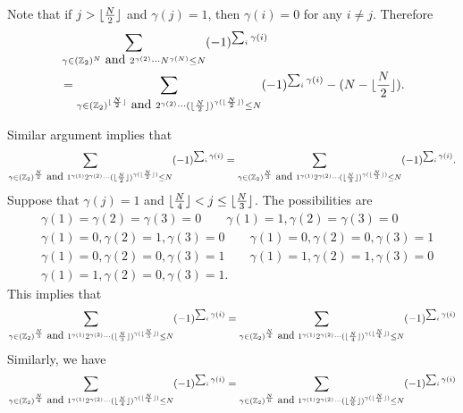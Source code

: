 \documentclass[a4paper,10pt]{amsart}
\newcommand{\Z}{\mathbb Z} %
\DeclarePairedDelimiter\floor{\lfloor}{\rfloor}
\begin{document}
Note that if $j > \floor{\frac{N}{2}}$ and $\gamma(j) = 1$, 
    then $\gamma(i) = 0$ for any $i \neq j$. 
    Therefore
    \begin{align*}
        &\sum_{\gamma \in (\Z_{2})^{N} \mbox{ and } 
        2^{\gamma(2)}\cdots N^{\gamma(N)} \leq N} 
        (-1)^{\sum_{i}\gamma(i)}\\ 
        &= \sum_{\gamma \in (\Z_{2})^{\floor{\frac{N}{2}}} \mbox{ and } 
        2^{\gamma(2)}\cdots 
        (\floor{\frac{N}{2}})^{\gamma(\floor{\frac{N}{2}})} \leq N} 
        (-1)^{\sum_{i}\gamma(i)} - (N- \floor{\frac{N}{2}}). 
    \end{align*}


Similar argument implies that
\begin{align*}
    \sum_{\gamma \in (\Z_{2})^{\frac{N}{2}} \mbox{ and } 
    1^{\gamma(1)}2^{\gamma(2)}\cdots 
(\floor{\frac{N}{2}})^{\gamma(\floor{\frac{N}{2}})} \leq N} 
    (-1)^{\sum_{i}\gamma(i)}
=\sum_{\gamma \in (\Z_{2})^{\frac{N}{3}} \mbox{ and } 
    1^{\gamma(1)}2^{\gamma(2)}\cdots 
(\floor{\frac{N}{3}})^{\gamma(\floor{\frac{N}{3}})} \leq N} 
    (-1)^{\sum_{i}\gamma(i)}.
\end{align*}
Suppose that $\gamma(j) = 1$ and $\floor{\frac{N}{4}} < j \leq 
\floor{\frac{N}{3}}$.
The possibilities are
\begin{align*}
    &\gamma(1) = \gamma(2) = \gamma(3) = 0 \qquad 
    \gamma(1) = 1, \gamma(2) = \gamma(3) = 0 \\
    &\gamma(1) = 0, \gamma(2) = 1, \gamma(3) = 0 \qquad 
    \gamma(1) = 0, \gamma(2) = 0, \gamma(3) = 1 \\
    &\gamma(1) = 0, \gamma(2) = 0, \gamma(3) = 1 \qquad 
    \gamma(1) = 1, \gamma(2) = 1, \gamma(3) = 0 \\
    &\gamma(1) = 1, \gamma(2) = 0, \gamma(3) = 1.
\end{align*}
This implies that
\begin{align*}
    \sum_{\gamma \in (\Z_{2})^{\frac{N}{3}} \mbox{ and } 
    1^{\gamma(1)}2^{\gamma(2)}\cdots 
(\floor{\frac{N}{3}})^{\gamma(\floor{\frac{N}{3}})} \leq N} 
    (-1)^{\sum_{i}\gamma(i)}
=\sum_{\gamma \in (\Z_{2})^{\frac{N}{4}} \mbox{ and } 
    1^{\gamma(1)}2^{\gamma(2)}\cdots 
(\floor{\frac{N}{4}})^{\gamma(\floor{\frac{N}{4}})} \leq N} 
    (-1)^{\sum_{i}\gamma(i)}
\end{align*}
Similarly, we have
\begin{align*}
    \sum_{\gamma \in (\Z_{2})^{\frac{N}{4}} \mbox{ and } 
    1^{\gamma(1)}2^{\gamma(2)}\cdots 
(\floor{\frac{N}{4}})^{\gamma(\floor{\frac{N}{4}})} \leq N} 
    (-1)^{\sum_{i}\gamma(i)}
    =\sum_{\gamma \in (\Z_{2})^{\frac{N}{6}} \mbox{ and } 
    1^{\gamma(1)}2^{\gamma(2)}\cdots 
(\floor{\frac{N}{6}})^{\gamma(\floor{\frac{N}{6}})} \leq N} 
    (-1)^{\sum_{i}\gamma(i)}
\end{align*}
\end{document}
